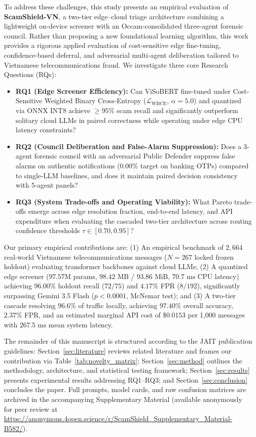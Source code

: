 \documentclass[journal]{IEEEtran}
\begin{document}
To address these challenges, this study presents an empirical evaluation of \textbf{ScamShield-VN}, a two-tier edge--cloud triage architecture combining a lightweight on-device screener with an Occam-consolidated three-agent forensic council. Rather than proposing a new foundational learning algorithm, this work provides a rigorous applied evaluation of cost-sensitive edge fine-tuning, confidence-based deferral, and adversarial multi-agent deliberation tailored to Vietnamese telecommunications fraud. We investigate three core Research Questions (RQs):
\begin{itemize}
    \item \textbf{RQ1 (Edge Screener Efficiency):} Can ViSoBERT fine-tuned under Cost-Sensitive Weighted Binary Cross-Entropy ($\mathcal{L}_{\text{WBCE}}$, $\alpha = 5.0$) and quantized via ONNX INT8 achieve $\ge 95\%$ scam recall and significantly outperform solitary cloud LLMs in paired correctness while operating under edge CPU latency constraints?
    \item \textbf{RQ2 (Council Deliberation and False-Alarm Suppression):} Does a 3-agent forensic council with an adversarial Public Defender suppress false alarms on authentic notifications ($0.00\%$ target on banking OTPs) compared to single-LLM baselines, and does it maintain paired decision consistency with 5-agent panels?
    \item \textbf{RQ3 (System Trade-offs and Operating Viability):} What Pareto trade-offs emerge across edge resolution fraction, end-to-end latency, and API expenditure when evaluating the cascaded two-tier architecture across routing confidence thresholds $\tau \in [0.70, 0.95]$?
\end{itemize}

Our primary empirical contributions are: (1) An empirical benchmark of $2,664$ real-world Vietnamese telecommunications messages ($N=267$ locked frozen holdout) evaluating transformer backbones against cloud LLMs; (2) A quantized edge screener ($97.57\text{M}$ params, $98.42\text{ MB}$ / $93.86\text{ MiB}$, $70.7\text{ ms}$ CPU latency) achieving $96.00\%$ holdout recall ($72/75$) and $4.17\%$ FPR ($8/192$), significantly surpassing Gemini 3.5 Flash ($p < 0.0001$, McNemar test); and (3) A two-tier cascade resolving $96.6\%$ of traffic locally, achieving $97.40\%$ overall accuracy, $2.37\%$ FPR, and an estimated marginal API cost of $\$0.0153$ per 1,000 messages with $267.5\text{ ms}$ mean system latency.

The remainder of this manuscript is structured according to the JAIT publication guidelines: Section~\ref{sec:literature} reviews related literature and frames our contribution via Table~\ref{tab:novelty_matrix}; Section~\ref{sec:method} outlines the methodology, architecture, and statistical testing framework; Section~\ref{sec:results} presents experimental results addressing RQ1--RQ3; and Section~\ref{sec:conclusion} concludes the paper. Full prompts, model cards, and raw confusion matrices are archived in the accompanying Supplementary Material (available anonymously for peer review at \url{https://anonymous.4open.science/r/ScamShield_Supplementary_Material-B582/}).
\end{document}
